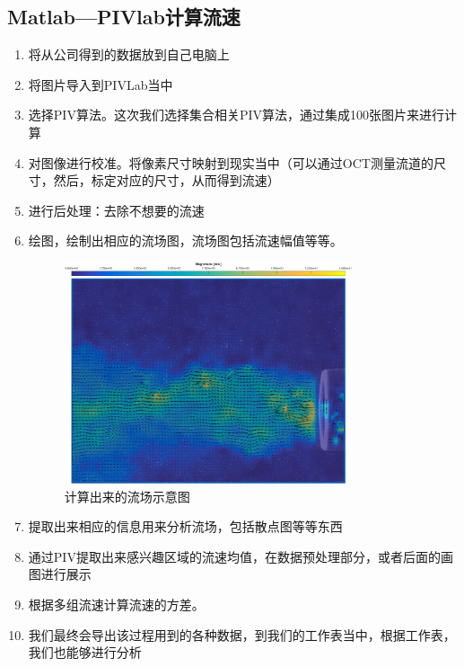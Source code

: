 \documentclass[12pt]{article}
\begin{document}
    \subsection{Matlab—PIVlab计算流速}
    \begin{enumerate}
        \item 将从公司得到的数据放到自己电脑上
        \item 将图片导入到PIVLab当中
        \item 选择PIV算法。这次我们选择集合相关PIV算法，通过集成100张图片来进行计算
        \item 对图像进行校准。将像素尺寸映射到现实当中（可以通过OCT测量流道的尺寸，然后，标定对应的尺寸，从而得到流速）
        \item 进行后处理：去除不想要的流速
        \item 绘图，绘制出相应的流场图，流场图包括流速幅值等等。
        
        \begin{figure}
            \centering
            \includegraphics[width=0.8\textwidth]{Images/经过Matlab处理后的图片.png}
            \caption{计算出来的流场示意图}
        \end{figure}
        \item 提取出来相应的信息用来分析流场，包括散点图等等东西
        \item 通过PIV提取出来感兴趣区域的流速均值，在数据预处理部分，或者后面的画图进行展示
        \item 根据多组流速计算流速的方差。
        \item 我们最终会导出该过程用到的各种数据，到我们的工作表当中，根据工作表，我们也能够进行分析
    \end{enumerate}
    
\end{document}
